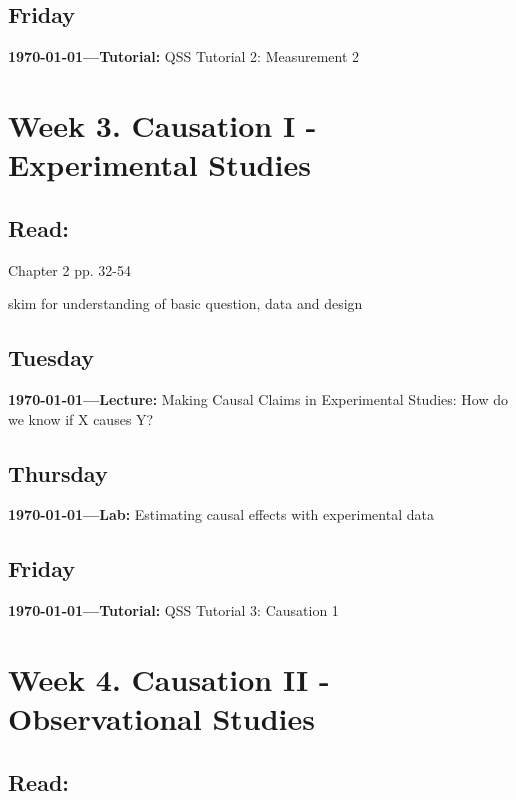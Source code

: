 \subsection{Friday} \textbf{\today---Tutorial:} QSS Tutorial 2: Measurement 2
\AdvanceDate[4]



\vspace{2em}



\section{Week 3. Causation I - Experimental Studies}

\subsection{Read:}

\citet{Imai2022-pm} Chapter 2 pp. 32-54

\citet{Broockman2016-pi} skim for understanding of basic question, data and design



\subsection{Tuesday} \textbf{\today---Lecture:}  Making Causal Claims in Experimental Studies: How do we know if X causes Y?
\AdvanceDate[2]

\subsection{Thursday} \textbf{\today---Lab:} Estimating causal effects with experimental data
\AdvanceDate[1]
\subsection{Friday} \textbf{\today---Tutorial:} QSS Tutorial 3: Causation 1
\AdvanceDate[4]


\vspace{2em}

\section{Week 4. Causation II - Observational Studies}

\subsection{Read:}

